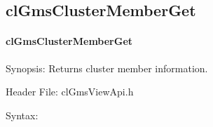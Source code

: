 \begin{flushleft}
\subsection{clGmsClusterMemberGet}
\hypertarget{pagegms105}{}\paragraph{cl\-Gms\-Cluster\-Member\-Get}\label{pagegms105}
\begin{Desc}
\item[Synopsis:]Returns cluster member information.\end{Desc}
\begin{Desc}
\item[Header File:]clGmsViewApi.h\end{Desc}
\begin{Desc}
\item[Syntax:]


\end{Desc}
\end{flushleft}
